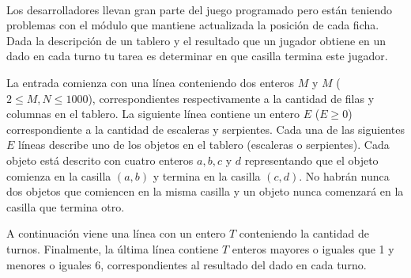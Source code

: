 \documentclass{oci}
\begin{document}
\begin{problemDescription}
  \begin{center}
    ~
  \end{center}

  Los desarrolladores llevan gran parte del juego programado pero están teniendo
  problemas con el módulo que mantiene actualizada la posición de cada ficha.
  Dada la descripción de un tablero y el resultado que un jugador obtiene en un
  dado en cada turno tu tarea es determinar en que casilla termina este jugador.
\end{problemDescription}

\begin{inputDescription}
  La entrada comienza con una línea conteniendo dos enteros $M$ y $M$ ($2 \leq
  M, N \leq 1000$), correspondientes respectivamente a la cantidad de filas y
  columnas en el tablero.
  La siguiente línea contiene un entero $E$ ($E \geq 0$) correspondiente a la
  cantidad de escaleras y serpientes.
  Cada una de las siguientes $E$ líneas describe uno de los objetos en el
  tablero (escaleras o serpientes).
  Cada objeto está descrito con cuatro enteros $a, b, c$ y $d$ representando que
  el objeto comienza en la casilla $(a, b)$ y termina en la casilla $(c, d)$.
  No habrán nunca dos objetos que comiencen en la misma casilla y un objeto
  nunca comenzará en la casilla que termina otro.

  A continuación viene una línea con un entero $T$ conteniendo la cantidad de
  turnos.
  Finalmente, la última línea contiene $T$ enteros mayores o iguales que 1 y
  menores o iguales 6, correspondientes al resultado del dado en cada turno.
\end{inputDescription}
\end{document}
